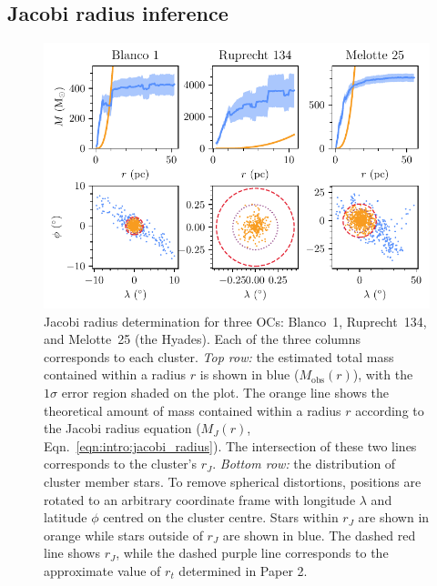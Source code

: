 \subsection{Jacobi radius inference}
\label{sec:dynamics:masses:jacobi}

\begin{figure}[t]
    \centering
    \includegraphics[width=\textwidth]{fig/c4/masses_jacobi_radii.pdf}
    \caption[Jacobi radius determination for three OCs: Blanco~1, Ruprecht~134, and Melotte~25]{Jacobi radius determination for three OCs: Blanco~1, Ruprecht~134, and Melotte~25 (the Hyades). Each of the three columns corresponds to each cluster. \emph{Top row:} the estimated total mass contained within a radius $r$ is shown in blue ($M_\text{obs}(r)$), with the $1\sigma$ error region shaded on the plot. The orange line shows the theoretical amount of mass contained within a radius $r$ according to the Jacobi radius equation ($M_J(r)$, Eqn.~\ref{eqn:intro:jacobi_radius}). The intersection of these two lines corresponds to the cluster's $r_J$. \emph{Bottom row:} the distribution of cluster member stars. To remove spherical distortions, positions are rotated to an arbitrary coordinate frame with longitude $\lambda$ and latitude $\phi$ centred on the cluster centre. Stars within $r_J$ are shown in orange while stars outside of $r_J$ are shown in blue. The dashed red line shows $r_J$, while the dashed purple line corresponds to the approximate value of $r_t$ determined in Paper 2.}
    \label{fig:dynamics:masses:radii_examples}
\end{figure}

